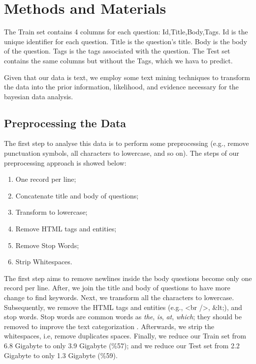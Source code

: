 \section{Methods and Materials} \label{sec:methods}

The Train set contains 4 columns for each question: Id,Title,Body,Tags.
Id is the unique identifier for each question.
Title is the question's title.
Body is the body of the question.
Tags is the tags associated with the question.
The Test set contains the same columns but without the Tags, which we hava to predict.

Given that our data is text, we employ some text mining techniques \citep{feldman2007text} to transform the data into the prior information, likelihood, and evidence necessary for the bayesian data analysis.

\subsection{Preprocessing the Data}

The first step to analyse this data is to perform some preprocessing (e.g., remove punctuation symbols, all characters to lowercase, and so on).
The steps of our preprocessing approach is showed below:

\begin{enumerate}
    \item One record per line;
    \item Concatenate title and body of questions;
    \item Transform to lowercase;
    \item Remove HTML tags and entities;
    \item Remove Stop Words;
    \item Strip Whitespaces.
\end{enumerate}

The first step aims to remove newlines inside the body questions become only one record per line.
After, we join the title and body of questions to have more change to find keywords.
Next, we transform all the characters to lowercase.
Subsequently, we remove the HTML tags and entities (e.g., <br />, \&lt;), and stop words.
Stop words are common words as \emph{the}, \emph{is}, \emph{at}, \emph{which}; they should be removed to improve the text categorization \citep{silva2003importance}.
Afterwards, we strip the whitespaces, i.e, remove duplicates spaces.
Finally, we reduce our Train set from 6.8 Gigabyte to only 3.9 Gigabyte (\%57); and we reduce our Test set from 2.2 Gigabyte to only 1.3 Gigabyte (\%59).

